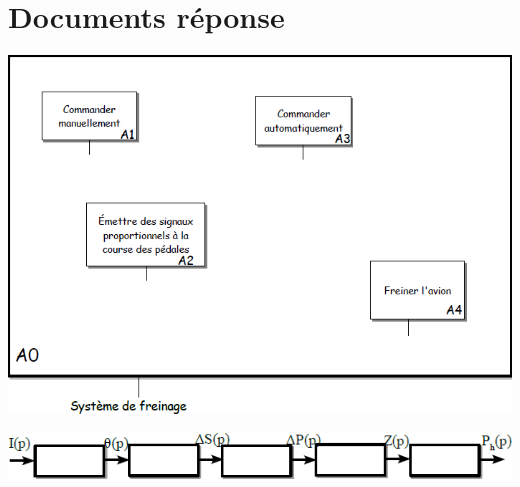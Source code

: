 \documentclass[10pt,oneside]{article}
\begin{document}
\section*{Documents réponse}
\begin{center}
\includegraphics[width=\textwidth]{png/image19.png}
\end{center}

\begin{center}
\includegraphics[width=\textwidth]{png/image20.png}
\end{center}
\end{document}
